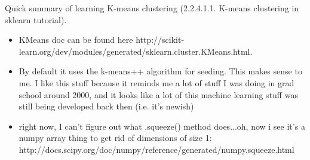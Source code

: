 \documentclass{article}
\begin{document}
	Quick summary of learning K-means clustering (2.2.4.1.1. K-means clustering in sklearn tutorial).

	\begin{itemize}
		\item KMeans doc can be found here http://scikit-learn.org/dev/modules/generated/sklearn.cluster.KMeans.html.
		\item By default it uses the k-means++ algorithm for seeding.  This makes sense to me.  I like this stuff because it reminds me a lot of stuff I was doing in grad school around 2000, and it looks like a lot of this machine learning stuff was still being developed back then (i.e. it's newish)
		\item right now, I can't figure out what .squeeze() method does...oh, now i see it's a numpy array thing to get rid of dimensions of size 1: http://docs.scipy.org/doc/numpy/reference/generated/numpy.squeeze.html
	\end{itemize}
\end{document}
